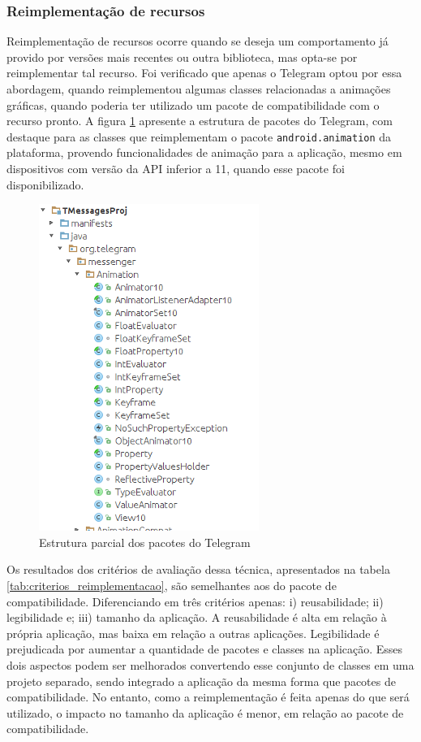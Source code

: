 \subsubsection{Reimplementação de recursos}
\label{sec:reimplementacao}
Reimplementação de recursos ocorre quando se deseja um comportamento já provido
por versões mais recentes ou outra biblioteca, mas opta-se por reimplementar tal
recurso. Foi verificado que apenas o Telegram optou por essa abordagem, quando
reimplementou algumas classes relacionadas a animações gráficas, quando poderia
ter utilizado um pacote de compatibilidade  com o recurso pronto. A figura \ref{fig:telegram_diretorio}
apresente a estrutura de pacotes do Telegram, com destaque para as classes que 
reimplementam o pacote \texttt{android.animation} da plataforma, provendo funcionalidades
de animação para a aplicação, mesmo em dispositivos com versão da API inferior a 
11, quando esse pacote foi disponibilizado.

\begin{figure}[ht]
\centering
\includegraphics{imagens/telegram_diretorio.png}
\caption{Estrutura parcial dos pacotes do Telegram}
\label{fig:telegram_diretorio}
\end{figure}

Os resultados dos critérios de avaliação dessa técnica, apresentados na tabela 
\ref{tab:criterios_reimplementacao}, são semelhantes aos do pacote de
compatibilidade. Diferenciando em três critérios apenas: i) reusabilidade;
ii) legibilidade e; iii) tamanho da aplicação. A reusabilidade é alta em relação
à própria aplicação, mas baixa em relação a outras aplicações. Legibilidade é
prejudicada por aumentar a quantidade de pacotes e classes na aplicação. Esses
dois aspectos podem ser melhorados convertendo esse conjunto de classes em uma
projeto separado, sendo integrado a aplicação da mesma forma que pacotes de
compatibilidade. No entanto, como a reimplementação é feita apenas do que será
utilizado, o impacto no tamanho da aplicação é menor, em relação ao pacote de
compatibilidade.

